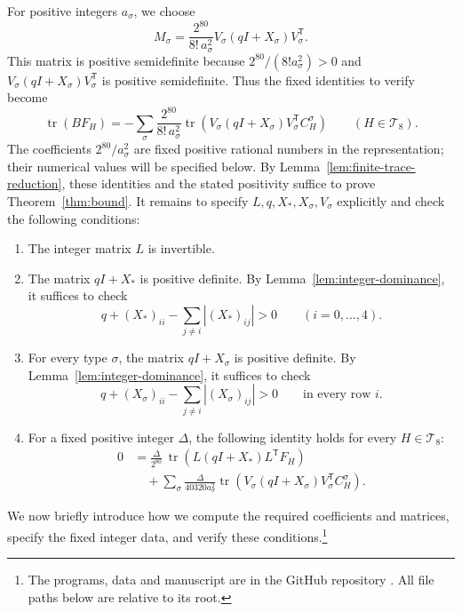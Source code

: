 \documentclass[11pt]{article}
\newcommand{\tr}{\operatorname{tr}}
\begin{document}
For positive integers $a_\sigma$, we choose
\[
M_\sigma=\frac{2^{80}}{8!\,a_\sigma^2}
V_\sigma(qI+X_\sigma)V_\sigma^{\mathsf T}.
\]
This matrix is positive semidefinite because $2^{80}/(8!a_\sigma^2)>0$
and $V_\sigma(qI+X_\sigma)V_\sigma^{\mathsf T}$ is positive semidefinite.
Thus the fixed identities to verify become
\[
\tr(BF_H)
=-\sum_\sigma\frac{2^{80}}{8!\,a_\sigma^2}
\tr\left(V_\sigma(qI+X_\sigma)V_\sigma^{\mathsf T}C_H^\sigma\right)
\qquad(H\in\mathcal T_8).
\]
The coefficients $2^{80}/a_\sigma^2$ are fixed positive rational numbers
in the representation; their numerical values will be specified below.
By Lemma~\ref{lem:finite-trace-reduction}, these identities and the stated
positivity suffice to prove Theorem~\ref{thm:bound}.
It remains to specify $L,q,X_*,X_\sigma,V_\sigma$ explicitly and check the following conditions:
\begin{enumerate}
\renewcommand{\theenumi}{\roman{enumi}}
\renewcommand{\labelenumi}{(\theenumi)}
\item\label{cond:L-invertible} The integer matrix $L$ is invertible.
\item\label{cond:spectral-positive} The matrix $qI+X_*$ is positive definite. By Lemma~\ref{lem:integer-dominance}, it suffices to check
\[
q+(X_*)_{ii}-\sum_{j\ne i}|(X_*)_{ij}|>0
\qquad(i=0,\ldots,4).
\]
\item\label{cond:flag-positive} For every type $\sigma$, the matrix $qI+X_\sigma$ is positive definite. By Lemma~\ref{lem:integer-dominance}, it suffices to check
\[
q+(X_\sigma)_{ii}-\sum_{j\ne i}|(X_\sigma)_{ij}|>0
\qquad\text{in every row }i.
\]
\item\label{cond:finite-identity} For a fixed positive integer $\Delta$, the following identity holds for every $H\in\mathcal T_8$:
\begin{align*}
0&=\frac{\Delta}{2^{80}}\,
\tr\left(L(qI+X_*)L^{\mathsf T}F_H\right)\\
&\quad+\sum_\sigma\frac{\Delta}{40320a_\sigma^2}
\tr\left(V_\sigma(qI+X_\sigma)V_\sigma^{\mathsf T}C_H^\sigma\right).
\end{align*}
\end{enumerate}

We now briefly introduce how we compute the required coefficients and matrices,
specify the fixed integer data, and verify these conditions.\footnote{\raggedright The programs, data and manuscript are in the GitHub repository
\href{https://github.com/Diudiutse/triangle-free-signless-laplacian}{}.
All file paths below are relative to its root.}
\end{document}
